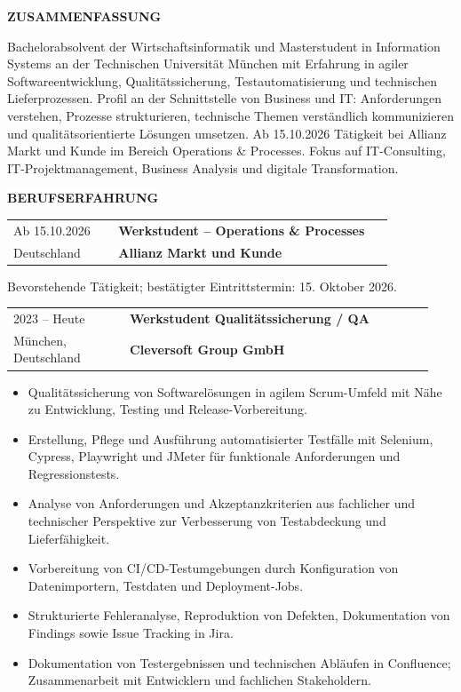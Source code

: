\documentclass[10pt,a4paper]{article}
\makeatletter
\newcommand{\sectiontitle}[1]{%
  \vspace{6pt}%
  \noindent\hspace{1.1em}\colorbox{white}{\bfseries\MakeUppercase{#1}}\par
  \vspace{1pt}%
}
\newenvironment{cvsection}[1]{%
  \Needspace{5\baselineskip}%
  \sectiontitle{#1}%
  \begin{lrbox}{\cvsectionbox}%
    \begin{minipage}{\dimexpr\textwidth-2\fboxsep-2\fboxrule-4pt\relax}%
    \vspace{2pt}
}{%
    \vspace{2pt}
    \end{minipage}%
  \end{lrbox}%
  \noindent\fbox{\usebox{\cvsectionbox}}%
  \par
}
\newcommand{\roleentry}[4]{%
  \begin{tabular*}{\linewidth}{@{}p{0.26\linewidth}@{\extracolsep{\fill}}p{0.68\linewidth}@{}}
    #1 & \textbf{#2} \\
    #3 & \textbf{#4}
  \end{tabular*}
}
\makeatother
\begin{document}
\fontsize{7.45}{8.65}\selectfont

\noindent{}

\begin{cvsection}{Zusammenfassung}
Bachelorabsolvent der Wirtschaftsinformatik und Masterstudent in Information Systems an der Technischen Universität München mit Erfahrung in agiler Softwareentwicklung, Qualitätssicherung, Testautomatisierung und technischen Lieferprozessen. Profil an der Schnittstelle von Business und IT: Anforderungen verstehen, Prozesse strukturieren, technische Themen verständlich kommunizieren und qualitätsorientierte Lösungen umsetzen. Ab 15.10.2026 Tätigkeit bei Allianz Markt und Kunde im Bereich Operations \& Processes. Fokus auf IT-Consulting, IT-Projektmanagement, Business Analysis und digitale Transformation.
\end{cvsection}

\begin{cvsection}{Berufserfahrung}
\roleentry{Ab 15.10.2026}{Werkstudent -- Operations \& Processes}{Deutschland}{Allianz Markt und Kunde}
Bevorstehende Tätigkeit; bestätigter Eintrittstermin: 15. Oktober 2026.

\vspace{4pt}
\roleentry{2023 -- Heute}{Werkstudent Qualitätssicherung / QA}{München, Deutschland}{Cleversoft Group GmbH}

\begin{itemize}[leftmargin=1.0em,itemsep=1pt,topsep=2pt,parsep=0pt,partopsep=0pt]
  \item Qualitätssicherung von Softwarelösungen in agilem Scrum-Umfeld mit Nähe zu Entwicklung, Testing und Release-Vorbereitung.
  \item Erstellung, Pflege und Ausführung automatisierter Testfälle mit Selenium, Cypress, Playwright und JMeter für funktionale Anforderungen und Regressionstests.
  \item Analyse von Anforderungen und Akzeptanzkriterien aus fachlicher und technischer Perspektive zur Verbesserung von Testabdeckung und Lieferfähigkeit.
  \item Vorbereitung von CI/CD-Testumgebungen durch Konfiguration von Datenimportern, Testdaten und Deployment-Jobs.
  \item Strukturierte Fehleranalyse, Reproduktion von Defekten, Dokumentation von Findings sowie Issue Tracking in Jira.
  \item Dokumentation von Testergebnissen und technischen Abläufen in Confluence; Zusammenarbeit mit Entwicklern und fachlichen Stakeholdern.
\end{itemize}
\end{cvsection}
\end{document}
